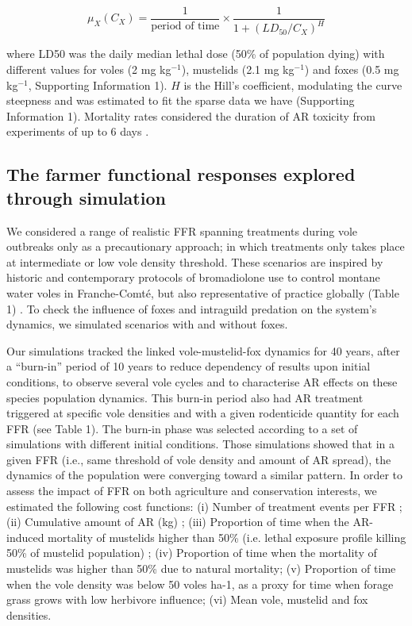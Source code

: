 \documentclass[11pt]{article}
\begin{document}
\begin{equation}
\mu_X(C_X) = \dfrac{1}{\text{period of time}} \times \dfrac{1}{1+ (LD_{50}/C_X)^H}
\end{equation}


where LD50 was the daily median lethal dose (50\% of population dying) with different values for voles (2 mg kg$^{-1}$), mustelids (2.1 mg kg$^{-1}$) and foxes (0.5 mg kg$^{-1}$, Supporting Information 1). $H$ is the Hill's coefficient, modulating the curve steepness and was estimated to fit the sparse data we have (Supporting Information 1). Mortality rates considered the duration of AR toxicity from experiments of up to 6 days \citep{Sage2010}.

\subsection{The farmer functional responses explored through simulation}

We considered a range of realistic FFR spanning treatments during vole outbreaks only as a precautionary approach; in which treatments only takes place at intermediate or low vole density threshold. These scenarios are inspired by historic and contemporary protocols of bromadiolone use to control montane water voles in Franche-Comté, but also representative of practice globally (Table 1) \citep{Delattre2009}. To check the influence of foxes and intraguild predation on the system’s dynamics, we simulated scenarios with and without foxes.

Our simulations tracked the linked vole-mustelid-fox dynamics for 40 years, after a “burn-in” period of 10 years to reduce dependency of results upon initial conditions, to observe several vole cycles and to characterise AR effects on these species population dynamics. This burn-in period also had AR treatment triggered at specific vole densities and with a given rodenticide quantity for each FFR (see Table 1). The burn-in phase was selected according to a set of simulations with different initial conditions. Those simulations showed that in a given FFR (i.e., same threshold of vole density and amount of AR spread), the dynamics of the population were converging toward a similar pattern. 
In order to assess the impact of FFR on both agriculture and conservation interests, we estimated the following cost functions: (i) Number of treatment events per FFR ; (ii) Cumulative amount of AR (kg) ; (iii) Proportion of time when the AR-induced mortality of mustelids higher than 50\% (i.e. lethal exposure profile killing 50\% of mustelid population) ; (iv) Proportion of time when the mortality of mustelids was higher than 50\% due to natural mortality; (v) Proportion of time when the vole density was below 50 voles ha-1, as a proxy for time when forage grass grows with low herbivore influence; (vi) Mean vole, mustelid and fox densities.
\end{document}
